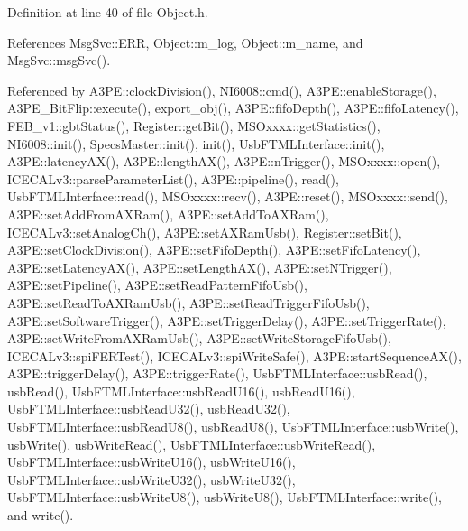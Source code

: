Definition at line 40 of file Object.\+h.



References Msg\+Svc\+::\+E\+RR, Object\+::m\+\_\+log, Object\+::m\+\_\+name, and Msg\+Svc\+::msg\+Svc().



Referenced by A3\+P\+E\+::clock\+Division(), N\+I6008\+::cmd(), A3\+P\+E\+::enable\+Storage(), A3\+P\+E\+\_\+\+Bit\+Flip\+::execute(), export\+\_\+obj(), A3\+P\+E\+::fifo\+Depth(), A3\+P\+E\+::fifo\+Latency(), F\+E\+B\+\_\+v1\+::gbt\+Status(), Register\+::get\+Bit(), M\+S\+Oxxxx\+::get\+Statistics(), N\+I6008\+::init(), Specs\+Master\+::init(), init(), Usb\+F\+T\+M\+L\+Interface\+::init(), A3\+P\+E\+::latency\+A\+X(), A3\+P\+E\+::length\+A\+X(), A3\+P\+E\+::n\+Trigger(), M\+S\+Oxxxx\+::open(), I\+C\+E\+C\+A\+Lv3\+::parse\+Parameter\+List(), A3\+P\+E\+::pipeline(), read(), Usb\+F\+T\+M\+L\+Interface\+::read(), M\+S\+Oxxxx\+::recv(), A3\+P\+E\+::reset(), M\+S\+Oxxxx\+::send(), A3\+P\+E\+::set\+Add\+From\+A\+X\+Ram(), A3\+P\+E\+::set\+Add\+To\+A\+X\+Ram(), I\+C\+E\+C\+A\+Lv3\+::set\+Analog\+Ch(), A3\+P\+E\+::set\+A\+X\+Ram\+Usb(), Register\+::set\+Bit(), A3\+P\+E\+::set\+Clock\+Division(), A3\+P\+E\+::set\+Fifo\+Depth(), A3\+P\+E\+::set\+Fifo\+Latency(), A3\+P\+E\+::set\+Latency\+A\+X(), A3\+P\+E\+::set\+Length\+A\+X(), A3\+P\+E\+::set\+N\+Trigger(), A3\+P\+E\+::set\+Pipeline(), A3\+P\+E\+::set\+Read\+Pattern\+Fifo\+Usb(), A3\+P\+E\+::set\+Read\+To\+A\+X\+Ram\+Usb(), A3\+P\+E\+::set\+Read\+Trigger\+Fifo\+Usb(), A3\+P\+E\+::set\+Software\+Trigger(), A3\+P\+E\+::set\+Trigger\+Delay(), A3\+P\+E\+::set\+Trigger\+Rate(), A3\+P\+E\+::set\+Write\+From\+A\+X\+Ram\+Usb(), A3\+P\+E\+::set\+Write\+Storage\+Fifo\+Usb(), I\+C\+E\+C\+A\+Lv3\+::spi\+F\+E\+R\+Test(), I\+C\+E\+C\+A\+Lv3\+::spi\+Write\+Safe(), A3\+P\+E\+::start\+Sequence\+A\+X(), A3\+P\+E\+::trigger\+Delay(), A3\+P\+E\+::trigger\+Rate(), Usb\+F\+T\+M\+L\+Interface\+::usb\+Read(), usb\+Read(), Usb\+F\+T\+M\+L\+Interface\+::usb\+Read\+U16(), usb\+Read\+U16(), Usb\+F\+T\+M\+L\+Interface\+::usb\+Read\+U32(), usb\+Read\+U32(), Usb\+F\+T\+M\+L\+Interface\+::usb\+Read\+U8(), usb\+Read\+U8(), Usb\+F\+T\+M\+L\+Interface\+::usb\+Write(), usb\+Write(), usb\+Write\+Read(), Usb\+F\+T\+M\+L\+Interface\+::usb\+Write\+Read(), Usb\+F\+T\+M\+L\+Interface\+::usb\+Write\+U16(), usb\+Write\+U16(), Usb\+F\+T\+M\+L\+Interface\+::usb\+Write\+U32(), usb\+Write\+U32(), Usb\+F\+T\+M\+L\+Interface\+::usb\+Write\+U8(), usb\+Write\+U8(), Usb\+F\+T\+M\+L\+Interface\+::write(), and write().


